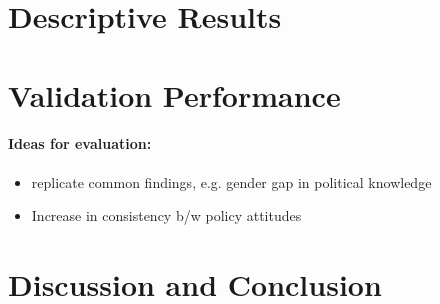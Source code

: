 \documentclass[12pt]{article}
\begin{document}
\section{Descriptive Results}


\section{Validation Performance}


\paragraph{Ideas for evaluation:}
\begin{itemize}\singlespacing
\item replicate common findings, e.g. gender gap in political knowledge \citep[e.g.][]{barabas2014question}
\item Increase in consistency b/w policy attitudes \citep[e.g.][]{prior2014visual}
\end{itemize}

\section{Discussion and Conclusion}


\clearpage\singlespacing\footnotesize


\end{document}
